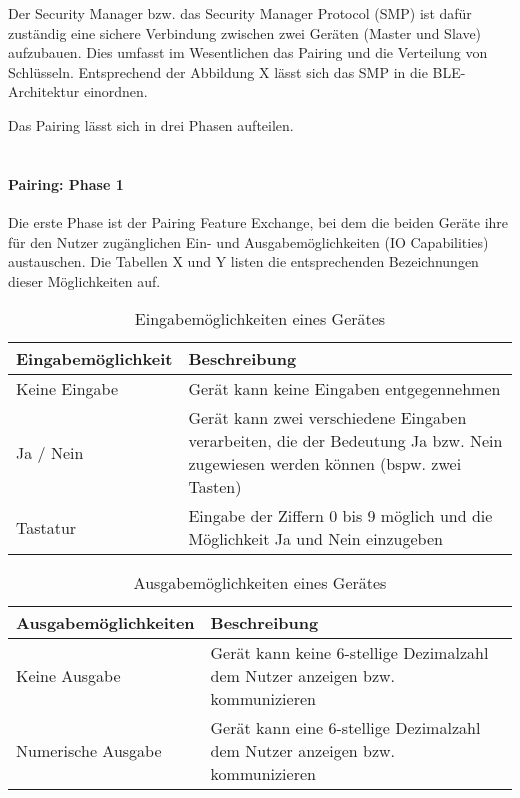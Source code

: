 Der Security Manager bzw. das Security Manager Protocol (SMP) ist dafür zuständig eine sichere Verbindung zwischen zwei Geräten (Master und Slave) aufzubauen. Dies umfasst im Wesentlichen das Pairing und die Verteilung von Schlüsseln. Entsprechend der Abbildung X lässt sich das SMP in die BLE-Architektur einordnen.

Das Pairing lässt sich in drei Phasen aufteilen.\\\\

\paragraph{Pairing: Phase 1}
Die erste Phase ist der Pairing Feature Exchange, bei dem die beiden Geräte ihre für den Nutzer zugänglichen Ein- und Ausgabemöglichkeiten (IO Capabilities) austauschen. Die Tabellen X und Y 
listen die entsprechenden Bezeichnungen dieser Möglichkeiten auf.

\begin{table}
    \begin{tabularx}{\textwidth}{|l|X|}
    \hline
    \textbf{Eingabemöglichkeit} & \textbf{Beschreibung} \\
    \hline
    Keine Eingabe & Gerät kann keine Eingaben entgegennehmen \\
    \hline
    Ja / Nein & Gerät kann zwei verschiedene Eingaben verarbeiten, die der Bedeutung Ja bzw. Nein zugewiesen werden können (bspw. zwei Tasten) \\
    \hline
    Tastatur & Eingabe der Ziffern 0 bis 9 möglich und die Möglichkeit Ja und Nein einzugeben \\
    \hline
    \end{tabularx}
    \caption{Eingabemöglichkeiten eines Gerätes}
\end{table}

\begin{table}
    \begin{tabularx}{\textwidth}{|l|X|}
    \hline
    \textbf{Ausgabemöglichkeiten} & \textbf{Beschreibung} \\
    \hline
    Keine Ausgabe & Gerät kann keine 6-stellige Dezimalzahl dem Nutzer anzeigen bzw. kommunizieren \\
    \hline
    Numerische Ausgabe & Gerät kann eine 6-stellige Dezimalzahl dem Nutzer anzeigen bzw. kommunizieren \\
    \hline
    \end{tabularx}
    \caption{Ausgabemöglichkeiten eines Gerätes}
\end{table}

